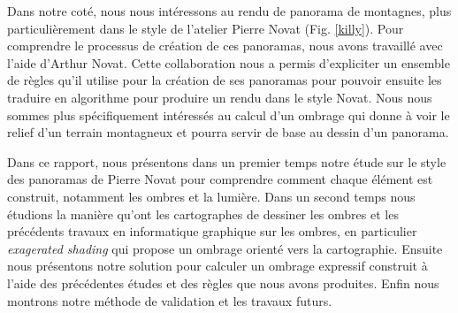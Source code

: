 Dans notre coté, nous nous intéressons au rendu de panorama de montagnes, plus particulièrement dans le style de l'atelier Pierre Novat (Fig. \ref{killy}). Pour comprendre le processus de création de ces panoramas, nous avons travaillé avec l'aide d'Arthur Novat. Cette collaboration nous a permis d'expliciter un ensemble de règles qu'il utilise pour la création de ses panoramas pour pouvoir ensuite les traduire en algorithme pour produire un rendu dans le style Novat. Nous nous sommes plus spécifiquement intéressés au calcul d'un ombrage qui donne à voir le relief d'un terrain montagneux et pourra servir de base au dessin d'un panorama. 

Dans ce rapport, nous présentons dans un premier temps notre étude sur le style des panoramas de Pierre Novat  pour comprendre comment chaque élément est construit, notamment les ombres et la lumière. Dans un second temps nous étudions la manière qu'ont les cartographes de dessiner les ombres et les précédents travaux en informatique graphique sur les ombres, en particulier \textit{exagerated shading} \cite{rusinkiewicz2006exaggerated} qui propose un ombrage orienté vers la cartographie. Ensuite nous présentons notre solution pour calculer un ombrage expressif construit à l'aide des précédentes études et des règles que nous avons produites. Enfin nous montrons notre méthode de validation et les travaux futurs. 


